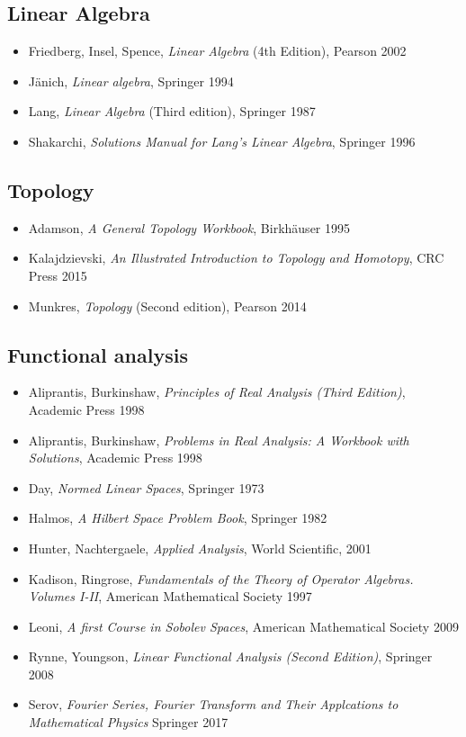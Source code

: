 \subsection*{Linear Algebra}

\begin{itemize}
\item Friedberg, Insel, Spence, \textit{Linear Algebra} (4th Edition), Pearson 2002
\item J\"anich, \textit{Linear algebra}, Springer 1994
\item Lang, \textit{Linear Algebra} (Third edition), Springer 1987
\item Shakarchi, \textit{Solutions Manual for Lang's Linear Algebra}, Springer 1996
\end{itemize}


\subsection*{Topology}

\begin{itemize}
\item Adamson, \textit{A General Topology Workbook}, Birkh\"auser 1995
\item Kalajdzievski, \textit{An Illustrated Introduction to Topology and Homotopy}, CRC Press 2015
\item Munkres, \textit{Topology} (Second edition), Pearson 2014
\end{itemize}


\subsection*{Functional analysis}

\begin{itemize}
\item Aliprantis, Burkinshaw, \textit{Principles of Real Analysis (Third Edition)}, Academic Press 1998
\item Aliprantis, Burkinshaw, \textit{Problems in Real Analysis: A Workbook with Solutions}, Academic Press 1998
\item Day, \textit{Normed Linear Spaces}, Springer 1973
\item Halmos, \textit{A Hilbert Space Problem Book}, Springer 1982
\item Hunter, Nachtergaele, \textit{Applied Analysis}, World Scientific, 2001
\item Kadison, Ringrose, \textit{Fundamentals of the Theory of Operator Algebras. Volumes I-II}, American Mathematical Society 1997
\item Leoni, \textit{A first Course in Sobolev Spaces}, American Mathematical Society 2009
\item Rynne, Youngson, \textit{Linear Functional Analysis (Second Edition)}, Springer 2008
\item Serov, \textit{Fourier Series, Fourier Transform and Their Applcations to Mathematical Physics} Springer 2017
\end{itemize}


